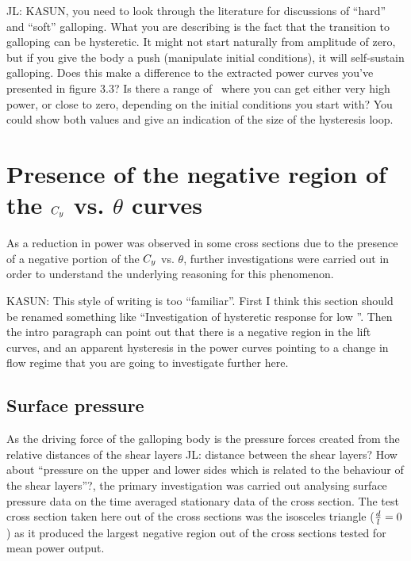 JL: KASUN, you need to look through the literature for discussions of ``hard'' and ``soft'' galloping. What you are describing is the fact that the transition to galloping can be hysteretic. It might not start naturally from amplitude of zero, but if you give the body a push (manipulate initial conditions), it will self-sustain galloping. Does this make a difference to the extracted power curves you've presented in figure 3.3? Is there a range of \massdamp\ where you can get either very high power, or close to zero, depending on the initial conditions you start with? You could show both values and give an indication of the size of the hysteresis loop.

\section{Presence of the negative region of the $C_{y}$ vs. $\theta$ curves}

As a reduction in power was observed in some cross sections due to the presence of a negative portion of the $C_{y}$ vs. $\theta$, further investigations were carried out in order to understand the underlying reasoning for this phenomenon.

KASUN: This style of writing is too ``familiar''. First I think this section should be renamed something like ``Investigation of hysteretic response for low \ratio''. Then the intro paragraph can point out that there is a negative region in the lift curves, and an apparent hysteresis in the power curves pointing to a change in flow regime that you are going to investigate further here.

\subsection{Surface pressure}
\label{subsec:cross-sec-surface pressure}

As the driving force of the galloping body is the pressure forces created from the relative distances of the shear layers JL: distance between the shear layers? How about ``pressure on the upper and lower sides which is related to the behaviour of the shear layers''?, the primary investigation was carried out analysing surface pressure data on the time averaged stationary data of the cross section. The test cross section taken here out of the cross sections was the isosceles triangle ($\frac{d}{l}=0$) as it produced the largest negative region out of the cross sections tested for mean power output. 

